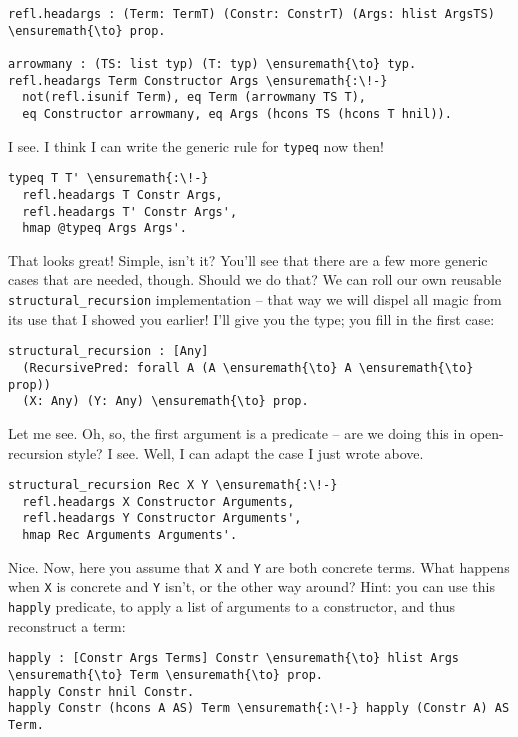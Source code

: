 \begin{verbatim}
refl.headargs : (Term: TermT) (Constr: ConstrT) (Args: hlist ArgsTS) \ensuremath{\to} prop.

arrowmany : (TS: list typ) (T: typ) \ensuremath{\to} typ.
refl.headargs Term Constructor Args \ensuremath{:\!-}
  not(refl.isunif Term), eq Term (arrowmany TS T),
  eq Constructor arrowmany, eq Args (hcons TS (hcons T hnil)).
\end{verbatim}

\heroSTUDENT{} I see. I think I can write the generic rule for \texttt{typeq}
now then!

\begin{verbatim}
typeq T T' \ensuremath{:\!-}
  refl.headargs T Constr Args,
  refl.headargs T' Constr Args',
  hmap @typeq Args Args'.
\end{verbatim}

\heroADVISOR{} That looks great! Simple, isn't it? You'll see that there are a
few more generic cases that are needed, though. Should we do that? We
can roll our own reusable \texttt{structural\_recursion} implementation
-- that way we will dispel all magic from its use that I showed you
earlier! I'll give you the type; you fill in the first case:

\begin{verbatim}
structural_recursion : [Any] 
  (RecursivePred: forall A (A \ensuremath{\to} A \ensuremath{\to} prop))
  (X: Any) (Y: Any) \ensuremath{\to} prop.
\end{verbatim}

\heroSTUDENT{} Let me see. Oh, so, the first argument is a predicate -- are we
doing this in open-recursion style? I see. Well, I can adapt the case I
just wrote above.

\begin{verbatim}
structural_recursion Rec X Y \ensuremath{:\!-}
  refl.headargs X Constructor Arguments,
  refl.headargs Y Constructor Arguments',
  hmap Rec Arguments Arguments'.
\end{verbatim}

\heroADVISOR{} Nice. Now, here you assume that \texttt{X} and \texttt{Y} are
both concrete terms. What happens when \texttt{X} is concrete and
\texttt{Y} isn't, or the other way around? Hint: you can use this
\texttt{happly} predicate, to apply a list of arguments to a
constructor, and thus reconstruct a term:

\begin{verbatim}
happly : [Constr Args Terms] Constr \ensuremath{\to} hlist Args \ensuremath{\to} Term \ensuremath{\to} prop.
happly Constr hnil Constr.
happly Constr (hcons A AS) Term \ensuremath{:\!-} happly (Constr A) AS Term.
\end{verbatim}

